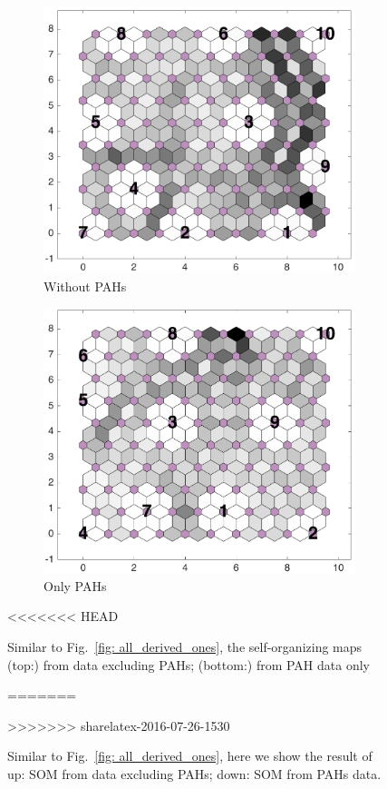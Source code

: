 \begin{figure}
    \begin{subfigure}[b]{0.5\textwidth}
        \centering
        \includegraphics[width=\textwidth]{../../images0.01/M31/2D/diff_dimension/combine_2D_data_between_cols11and26.png}
    \caption{Without PAHs}
    \label{fig: wt_pahs}
    \end{subfigure}
    \hfill
    \begin{subfigure}[b]{0.5\textwidth}
        \includegraphics[width=\textwidth]{../../images0.01/M31/2D/diff_dimension/combine_2D_data_between_cols3and10.png}
    \caption{Only PAHs}
    \label{fig: only_pahs}
    \end{subfigure}
<<<<<<< HEAD
    \caption{Similar to Fig.~\ref{fig: all_derived_ones}, the self-organizing maps (top:) from data excluding PAHs; (bottom:) from PAH data only}
=======
    \caption{Similar to Fig.~\ref{fig: all_derived_ones}, here we show the result of up: SOM from data excluding PAHs; down: SOM from PAHs data.}
>>>>>>> sharelatex-2016-07-26-1530
    \label{fig: PAHS_or_not_PAHs}
\end{figure}
